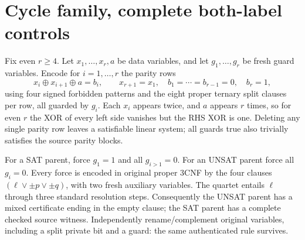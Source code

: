 \documentclass[11pt]{article}
\begin{document}
\section{Cycle family, complete both-label controls}
Fix even $r\ge4$. Let $x_1,\ldots,x_r,a$ be data variables, and let $g_1,\ldots,g_r$ be fresh guard variables. Encode for $i=1,\ldots,r$ the parity rows
\[
 x_i\oplus x_{i+1}\oplus a=b_i,\qquad x_{r+1}=x_1,\quad b_1=\cdots=b_{r-1}=0,\quad b_r=1,
 \tag{5}
\]
using four signed forbidden patterns and the eight proper ternary split clauses per row, all guarded by $g_i$. Each $x_i$ appears twice, and $a$ appears $r$ times, so for even $r$ the XOR of every left side vanishes but the RHS XOR is one. Deleting any single parity row leaves a satisfiable linear system; all guards true also trivially satisfies the source parity blocks.

For a SAT parent, force $g_1=1$ and all $g_{i>1}=0$. For an UNSAT parent force all $g_i=0$. Every force is encoded in original proper 3CNF by the four clauses $(\ell\lor\pm p\lor\pm q)$, with two fresh auxiliary variables. The quartet entails $\ell$ through three standard resolution steps. Consequently the UNSAT parent has a mixed certificate ending in the empty clause; the SAT parent has a complete checked source witness. Independently rename/complement original variables, including a split private bit and a guard: the same authenticated rule survives.
\end{document}
